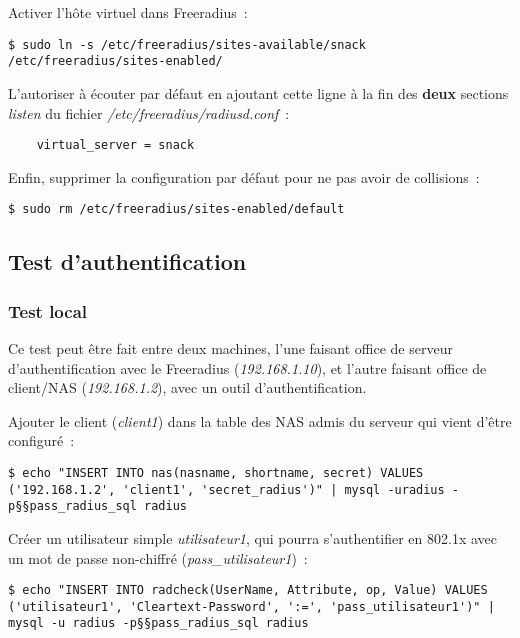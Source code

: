 Activer l'hôte virtuel dans Freeradius~:

\begin{lstlisting}
$ sudo ln -s /etc/freeradius/sites-available/snack /etc/freeradius/sites-enabled/
\end{lstlisting}

L'autoriser à écouter par défaut en ajoutant cette ligne à la fin des \textbf{deux} sections \emph{listen} du fichier \emph{/etc/freeradius/radiusd.conf}~:

\begin{lstlisting}
    virtual_server = snack
\end{lstlisting}

Enfin, supprimer la configuration par défaut pour ne pas avoir de collisions~:

\begin{lstlisting}
$ sudo rm /etc/freeradius/sites-enabled/default
\end{lstlisting}

\subsection{Test d'authentification}
\subsubsection{Test local}

Ce test peut être fait entre deux machines, l'une faisant office de serveur d'authentification avec le Freeradius (\emph{192.168.1.10}), et l'autre faisant office de client/NAS (\emph{192.168.1.2}), avec un outil d'authentification.

\label{ajout-nas}
Ajouter le client (\emph{client1}) dans la table des NAS admis du serveur qui vient d'être configuré~:

\begin{lstlisting}
$ echo "INSERT INTO nas(nasname, shortname, secret) VALUES ('192.168.1.2', 'client1', 'secret_radius')" | mysql -uradius -p§§pass_radius_sql radius
\end{lstlisting}

\label{ajout-utilisateur-md5}
Créer un utilisateur simple \emph{utilisateur1}, qui pourra s'authentifier en 802.1x avec un mot de passe non-chiffré (\emph{pass\_utilisateur1})~:

\begin{lstlisting}
$ echo "INSERT INTO radcheck(UserName, Attribute, op, Value) VALUES ('utilisateur1', 'Cleartext-Password', ':=', 'pass_utilisateur1')" | mysql -u radius -p§§pass_radius_sql radius
\end{lstlisting}

